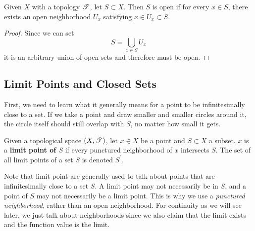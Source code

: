   \begin{lemma}
    Given $X$ with a topology $\T$, let $S \subset X$. Then $S$ is open if for every $x \in S$, there exists an open neighborhood $U_x$ satisfying $x \in U_x \subset S$. 
  \end{lemma}
  \begin{proof}
    Since we can set 
    \begin{equation}
      S = \bigcup_{x \in S} U_x
    \end{equation}
    it is an arbitrary union of open sets and therefore must be open. 
  \end{proof}
 
\subsection{Limit Points and Closed Sets} 

  First, we need to learn what it generally means for a point to be infinitesimally close to a set. If we take a point and draw smaller and smaller circles around it, the circle itself should still overlap with $S$, no matter how small it gets.

  \begin{definition}
    Given a topological space $(X, \T)$, let $x \in X$ be a point and $S \subset X$ a subset. $x$ is a \textbf{limit point of $S$} if every punctured neighborhood of $x$ intersects $S$. The set of all limit points of a set $S$ is denoted $S^\prime$.  
  \end{definition} 

  Note that limit point are generally used to talk about points that are infinitesimally close to a set $S$. A limit point may not necessarily be in $S$, and a point of $S$ may not necessarily be a limit point. This is why we use a \textit{punctured neighborhood}, rather than an open neighborhood. For continuity as we will see later, we just talk about neighborhoods since we also claim that the limit exists and the function value is the limit.

